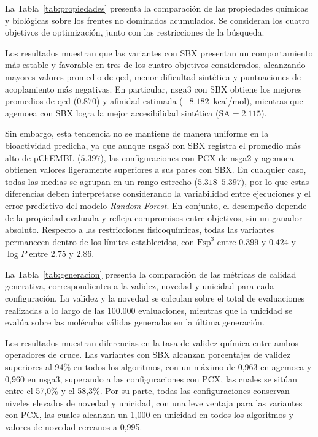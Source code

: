La Tabla~\ref{tab:propiedades} presenta la comparación de las propiedades químicas y biológicas sobre los frentes no dominados acumulados. Se consideran los cuatro objetivos de optimización, junto con las restricciones de la búsqueda.



Los resultados muestran que las variantes con SBX presentan un comportamiento más estable y favorable en tres de los cuatro objetivos considerados, alcanzando mayores valores promedio de \gls{qed}, menor dificultad sintética y puntuaciones de acoplamiento más negativas. En particular, \acrshort{nsga3} con SBX obtiene los mejores promedios de \gls{qed} ($0.870$) y afinidad estimada ($-8.182$~kcal/mol), mientras que \acrshort{agemoea} con SBX logra la mejor accesibilidad sintética ($\text{SA} = 2.115$).

Sin embargo, esta tendencia no se mantiene de manera uniforme en la bioactividad predicha, ya que aunque \acrshort{nsga3} con SBX registra el promedio más alto de pChEMBL ($5.397$), las configuraciones con PCX de \acrshort{nsga2} y \acrshort{agemoea} obtienen valores ligeramente superiores a sus pares con SBX. En cualquier caso, todas las medias se agrupan en un rango estrecho ($5.318$--$5.397$), por lo que estas diferencias deben interpretarse considerando la variabilidad entre ejecuciones y el error predictivo del modelo \textit{Random Forest}. En conjunto, el desempeño depende de la propiedad evaluada y refleja compromisos entre objetivos, sin un ganador absoluto. Respecto a las restricciones fisicoquímicas, todas las variantes permanecen dentro de los límites establecidos, con $\text{Fsp}^3$ entre $0.399$ y $0.424$ y $\log P$ entre $2.75$ y $2.86$.

La Tabla~\ref{tab:generacion} presenta la comparación de las métricas de calidad generativa, correspondientes a la validez, novedad y unicidad para cada configuración. La validez y la novedad se calculan sobre el total de evaluaciones realizadas a lo largo de las 100.000 evaluaciones, mientras que la unicidad se evalúa sobre las moléculas válidas generadas en la última generación.



Los resultados muestran diferencias en la tasa de validez química entre ambos operadores de cruce. Las variantes con SBX alcanzan porcentajes de validez superiores al 94\% en todos los algoritmos, con un máximo de 0,963 en \acrshort{agemoea} y 0,960 en \acrshort{nsga3}, superando a las configuraciones con PCX, las cuales se sitúan entre el 57,0\% y el 58,3\%. Por su parte, todas las configuraciones conservan niveles elevados de novedad y unicidad, con una leve ventaja para las variantes con PCX, las cuales alcanzan un 1,000 en unicidad en todos los algoritmos y valores de novedad cercanos a 0,995.

